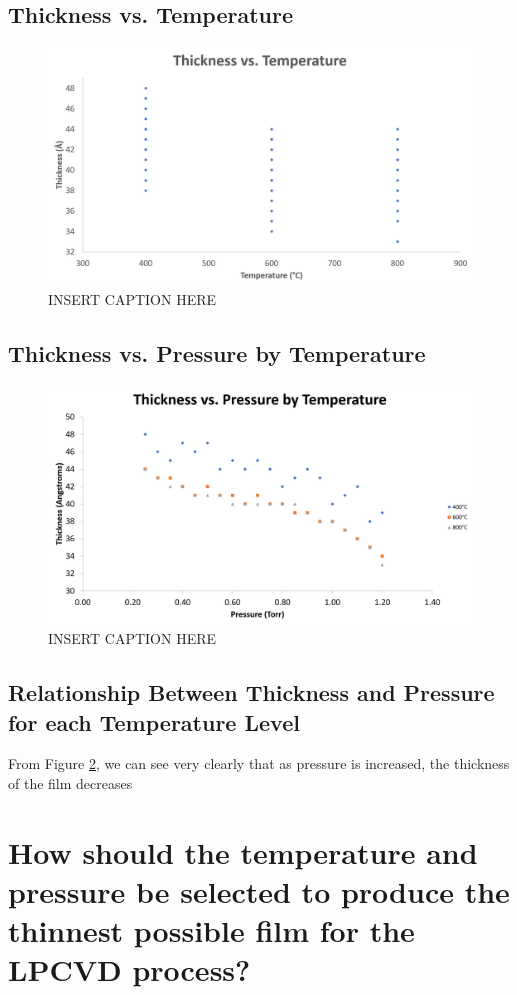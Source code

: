 \documentclass[letterpaper]{article}
\begin{document}
  \subsection{Thickness vs. Temperature}

    \begin{figure}[H]
      \centering
      \includegraphics[width=\textwidth]{thiccvstemp.png}
      \caption{INSERT CAPTION HERE}
      \label{thiccvstemp}
    \end{figure}

  \subsection{Thickness vs. Pressure by Temperature}

    \begin{figure}[H]
      \centering
      \includegraphics[width=\textwidth]{thiccvspressurebytemp.png}
      \caption{INSERT CAPTION HERE}
      \label{thiccvspressurebytemp}
    \end{figure}


  \subsection{Relationship Between Thickness and Pressure for each Temperature Level}

    From Figure \ref{thiccvspressurebytemp}, we can see very clearly that as pressure
    is increased, the thickness of the film decreases

    \section{How should the temperature and pressure be selected to produce the thinnest possible film for the LPCVD process?}
\end{document}
